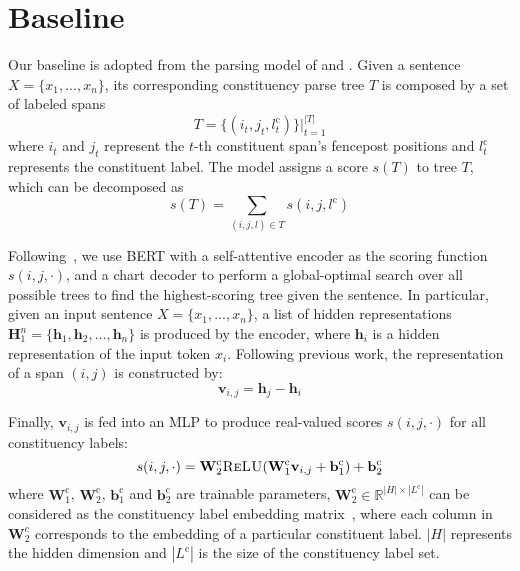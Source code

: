 \documentclass[11pt]{article}
\begin{document}
\section{Baseline}
\label{sec:baseline}
Our baseline is adopted from the parsing model of \citet{san-constituency} and \citet{kitaev-etal-2019-multi-lingual}. 
Given a sentence $X=\{x_1,...,x_n\}$, its corresponding constituency parse tree $T$ is composed by a set of labeled spans 
\begin{equation}
    T = \{(i_t,j_t,l^{\mathrm{c}}_t)\}|_{t=1}^{|T|}
\end{equation}
where $i_t$ and $j_t$ represent the $t$-{th} constituent span's fencepost positions and $l^{\mathrm{c}}_t$ represents the constituent label. 
The model assigns a score $s(T)$ to tree $T$, which can be decomposed as
\begin{equation}
   s(T) = \sum_{(i,j,l)\in T} s(i,j,l^{\mathrm{c}})
\end{equation}

Following~\citet{kitaev-etal-2019-multi-lingual}, we use BERT with a self-attentive encoder as the scoring function $s(i, j, \cdot)$, and a chart decoder to perform a global-optimal search over all possible trees to find the highest-scoring tree given the sentence.
In particular, given an input sentence $X=\{x_1,...,x_n\}$, a list of hidden representations $\mathbf{H}_1^n = \{\mathbf{h}_1,\mathbf{h}_2,\dots,\mathbf{h}_n\}$ is produced by the encoder, where $\mathbf{h}_i$ is a hidden representation of the input token $x_i$. 
Following previous work, the representation of a span $(i,j)$ is constructed by:
\begin{equation}
    \mathbf{v}_{i,j} = \mathbf{h}_j - \mathbf{h}_i
\label{eq:span_rep}
\end{equation}

Finally, $\mathbf{v}_{i,j}$ is fed into an MLP to produce real-valued scores $s(i,j,\cdot)$ for all constituency labels: 
\begin{equation}
\fontsize{10}{12}\selectfont
    s(i,j,\cdot) = \mathbf{W}^{\mathrm{c}}_2  \textsc{ReLU}(\mathbf{W}^{\mathrm{c}}_1 \mathbf{v}_{i,j} + \mathbf{b}^{\mathrm{c}}_1) + \mathbf{b}^{\mathrm{c}}_2
\label{eq:mlp_1}
\end{equation}
where 
$\mathbf{W}^{\mathrm{c}}_1$, $\mathbf{W}^{\mathrm{c}}_2$, $\mathbf{b}^{\mathrm{c}}_1$ and $\mathbf{b}^{\mathrm{c}}_2$ are trainable parameters, 
$\mathbf{W}^{\mathrm{c}}_2 \in \mathbb{R}^{|H| \times |L^\mathrm{c}|}$ can be considered as the constituency label embedding matrix~\cite{lan}, where each column in $\mathbf{W}_2^c$ corresponds to the embedding of a particular constituent label. $|H|$ represents the hidden dimension and $|L^\mathrm{c}|$ is the size of the constituency label set. 
\end{document}
